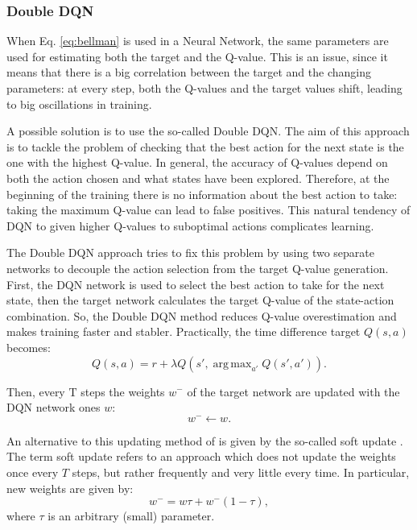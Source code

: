 \documentclass[a4paper, 12pt]{article}
\numberwithin{equation}{section}
\DeclareMathOperator*{\argmax}{arg\,max}
\begin{document}
\subsubsection{Double DQN}

When Eq. \eqref{eq:bellman} is used in a Neural Network, the same parameters are used for estimating both the target and the Q-value. This is an issue, since it means that there is a big correlation between the target and the changing parameters: at every step, both the Q-values and the target values shift, leading to big oscillations in training.

A possible solution is to use the so-called Double DQN. The aim of this approach is to tackle the problem of checking that the best action for the next state is the one with the highest Q-value. In general, the accuracy of Q-values depend on both the action chosen and what states have been explored. Therefore, at the beginning of the training there is no information about the best action to take: taking the maximum Q-value can lead to false positives. This natural tendency of DQN to given higher Q-values to suboptimal actions complicates learning.

The Double DQN approach tries to fix this problem by using two separate networks to decouple the action selection from the target Q-value generation. First, the DQN network is used to select the best action to take for the next state, then the target network calculates the target Q-value of the state-action combination. So, the Double DQN method reduces Q-value overestimation and makes training faster and stabler. Practically, the time difference target $Q\left(s,a\right)$ becomes:
\begin{equation}
	Q\left(s,a\right)=r+\lambda Q\left(s',\argmax_{a'}Q\left(s',a'\right)\right).
\end{equation}

Then, every $\mathrm{T}$ steps the weights $w^-$ of the target network are updated with the DQN network ones $w$:
\begin{equation}
	w^-\leftarrow w.
\end{equation}

An alternative to this updating method of is given by the so-called soft update \cite{soft-update}. The term soft update refers to an approach which does not update the weights once every $T$ steps, but rather frequently and very little every time. In particular, new weights are given by:
\begin{equation}
	w^-=w\tau+w^-\left(1-\tau\right),
\end{equation}
where $\tau$ is an arbitrary (small) parameter.
\end{document}
